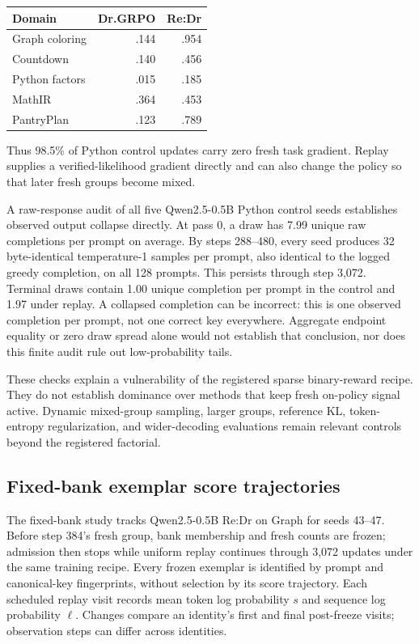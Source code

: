 \documentclass{article}
\newcommand{\1}{\mathbf 1}
\theoremstyle{remark}
\theoremstyle{definition}
\theoremstyle{plain}
\begin{document}
\begin{center}
\small
\begin{tabular}{@{}lrr@{}}
\toprule
\textbf{Domain} & \textbf{Dr.GRPO} & \textbf{Re:Dr} \\
\midrule
Graph coloring & .144 & .954 \\
Countdown & .140 & .456 \\
Python factors & .015 & .185 \\
MathIR & .364 & .453 \\
PantryPlan & .123 & .789 \\
\bottomrule
\end{tabular}
\end{center}

Thus 98.5\% of Python control updates carry zero fresh task gradient.
Replay supplies a verified-likelihood gradient directly and can also
change the policy so that later fresh groups become mixed.

A raw-response audit of all five Qwen2.5-0.5B Python control seeds establishes
observed output collapse directly. At pass 0, a draw has 7.99 unique raw
completions per prompt on average. By steps 288--480, every seed produces
32 byte-identical temperature-1 samples per prompt, also identical to the
logged greedy completion, on all 128 prompts. This persists through step
3,072. Terminal draws contain 1.00 unique completion per prompt in the
control and 1.97 under replay. A collapsed completion can be incorrect:
this is one observed completion per prompt, not one correct key everywhere.
Aggregate endpoint equality or zero draw spread alone would not establish
that conclusion, nor does this finite audit rule out low-probability tails.

These checks explain a vulnerability of the registered sparse binary-reward
recipe. They do not establish dominance over methods that keep fresh
on-policy signal active. Dynamic mixed-group sampling, larger groups,
reference KL, token-entropy regularization, and wider-decoding evaluations
remain relevant controls beyond the registered factorial.

\subsection{Fixed-bank exemplar score trajectories}
\label{app:fixed-bank-survival}

The fixed-bank study tracks Qwen2.5-0.5B Re:Dr on Graph for seeds
43--47. Before step 384's fresh group, bank membership and fresh counts
are frozen; admission then stops while uniform replay continues through
3,072 updates under the same training recipe. Every frozen exemplar is
identified by prompt and canonical-key fingerprints, without selection by
its score trajectory. Each scheduled replay visit records mean token log
probability $s$ and sequence log probability $\ell$. Changes compare an
identity's first and final post-freeze visits; observation steps can differ
across identities.
\end{document}
